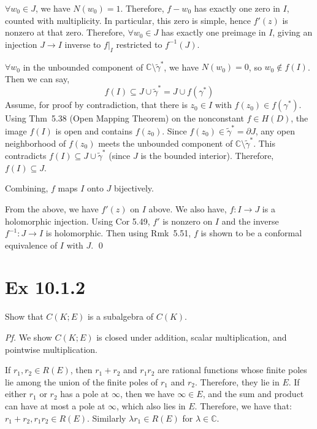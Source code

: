 \documentclass[a4paper]{article}
\begin{document}
\medskip
$\forall w_0 \in J$, we have $N(w_0) = 1$. Therefore,  $f - w_0$ has
exactly one zero in $I$, counted with multiplicity. In particular, this zero is simple, hence
$f'(z)$ is nonzero at that zero. Therefore, $\forall w_0 \in J$ has exactly one preimage in $I$, giving an
injection $J \to I$ inverse to $f|_I$ restricted to $f^{-1}(J)$.

\medskip
$\forall w_0$ in the unbounded component of $\mathbb{C} \setminus \tilde{\gamma}^*$, we have
$N(w_0) = 0$, so $w_0 \notin f(I)$. Then we can say,
\[
f(I) \subseteq J \cup \tilde{\gamma}^* = J \cup f(\gamma^*)
\]
Assume, for proof by contradiction, that there is $z_0 \in I$ with $f(z_0) \in f(\gamma^*)$. Using Thm~5.38 (Open Mapping Theorem) on the nonconstant $f \in H(D)$, the image $f(I)$ is
open and contains $f(z_0)$. Since $f(z_0) \in \tilde{\gamma}^* = \partial J$, any open
neighborhood of $f(z_0)$ meets the unbounded component of $\mathbb{C} \setminus
\tilde{\gamma}^*$. This contradicts $f(I) \subseteq J \cup \tilde{\gamma}^*$ (since $J$ is the bounded interior). Therefore,
$f(I) \subseteq J$. 


Combining, $f$ maps $I$ onto $J$ bijectively.

\medskip
From the above, we have $f'(z)$ on $I$ above. We also have, $f : I
\to J$ is a holomorphic injection. Using Cor 5.49, $f'$ is nonzero on $I$ and the inverse
$f^{-1} : J \to I$ is holomorphic. Then using Rmk~5.51, $f$ is shown to be a conformal equivalence of $I$ with
$J$. \qed

\newpage
\section*{Ex 10.1.2}

\begin{tcolorbox}[colback=gray!10, colframe=black, boxrule=0.5pt, arc=2mm]
Show that $C(K; E)$ is a subalgebra of $C(K)$.
\end{tcolorbox}

\textit{Pf.} We show $C(K; E)$ is closed under addition, scalar
multiplication, and pointwise multiplication.

\medskip
If $r_1, r_2 \in R(E)$, then $r_1 + r_2$ and $r_1 r_2$ are
rational functions whose finite poles lie among the union of the finite poles of $r_1$ and
$r_2$. Therefore, they lie in $E$. If either $r_1$ or $r_2$ has a pole at $\infty$, then we have $\infty \in E$, and the sum and product can have at most a pole at $\infty$, which also lies in $E$. Therefore, we have that:
$r_1 + r_2, r_1 r_2 \in R(E)$. Similarly $\lambda r_1 \in R(E)$ for $\lambda \in \mathbb{C}$.
\end{document}
